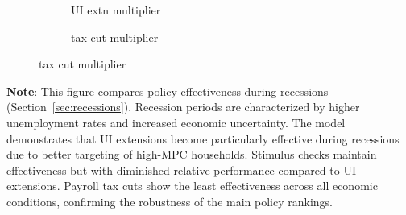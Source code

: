 \documentclass[\latexroot/\projectname]{subfiles}
\begin{document}
\begin{figure}[H]
\begin{minipage}{\textwidth}
\begin{subfigure}[b]{.32\linewidth}
    \end{subfigure}
    \hfill%
    \begin{subfigure}[b]{.32\linewidth}
      \centering
      \caption{UI extn multiplier}
      \whenintegrated{\label{fig:recessionuirelrecession_Mult}} %
    \end{subfigure}
    \hfill%
    \begin{subfigure}[b]{.32\linewidth}
      \centering
      \caption{tax cut multiplier}
      \whenintegrated{\label{fig:recessiontaxcutrelrecession_Mult}} %
    \end{subfigure}
  \end{minipage}
\end{figure}
\noindent\parbox{\textwidth}{\footnotesize
  \textbf{Note}: This figure compares policy effectiveness during recessions (Section~\ref{sec:recessions}).
  Recession periods are characterized by higher unemployment rates and increased economic uncertainty.
  The model demonstrates that UI extensions become particularly effective during recessions due to
  better targeting of high-MPC households. Stimulus checks maintain effectiveness but with diminished
  relative performance compared to UI extensions. Payroll tax cuts show the least effectiveness
  across all economic conditions, confirming the robustness of the main policy rankings.
}

\vspace{1em}
\FloatBarrier %

\smartbib
\end{document}
